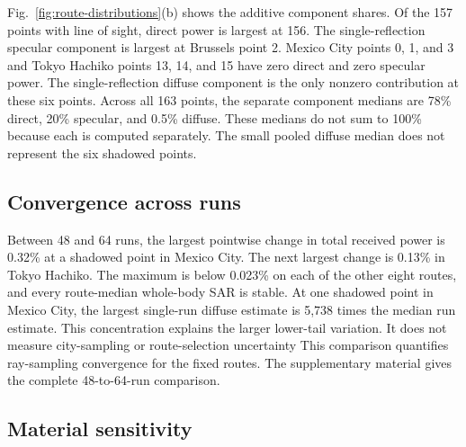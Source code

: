 \documentclass{IEEEoj}
\providecommand{\DIFadd}[1]{{\protect\color{blue} \sf #1}} %
\providecommand{\DIFdel}[1]{{\protect\color{red} \scriptsize #1}} %
\providecommand{\DIFaddbegin}{} %
\providecommand{\DIFaddend}{} %
\providecommand{\DIFdelbegin}{} %
\providecommand{\DIFdelend}{} %
\begin{document}
Fig.~\ref{fig:route-distributions}(b) shows the additive component shares. Of
the 157 points with line of sight, direct power is largest at 156. The
single-reflection specular component is largest at Brussels point 2. Mexico City
points 0, 1, and 3 and Tokyo Hachiko points 13, 14, and 15 have zero direct and
zero specular power. The single-reflection diffuse component is the only
nonzero contribution at these six points. Across all 163 points, the separate
component medians are 78\% direct, 20\% specular, and 0.5\% diffuse. These
medians do not sum to 100\% because each is computed separately. The small
pooled diffuse median does not represent the six shadowed points.

\subsection{Convergence across runs}
\label{sec:convergence}

Between 48 and 64 runs, the largest pointwise change in total received power is
0.32\% at a shadowed point in Mexico City. The next largest change is 0.13\% in
Tokyo Hachiko. The maximum is below 0.023\% on each of the other eight routes,
and every route-median whole-body SAR is stable. At one shadowed point in Mexico
City, the largest single-run diffuse estimate is 5,738 times the median run estimate. This
concentration explains the larger lower-tail variation. \DIFdelbegin \DIFdel{It does not measure
city-sampling or route-selection uncertainty}\DIFdelend \DIFaddbegin \DIFadd{This comparison
quantifies ray-sampling convergence for the fixed routes}\DIFaddend . The supplementary material gives
the complete 48-to-64-run comparison.

\subsection{Material sensitivity}
\label{sec:material-sensitivity}
\end{document}
